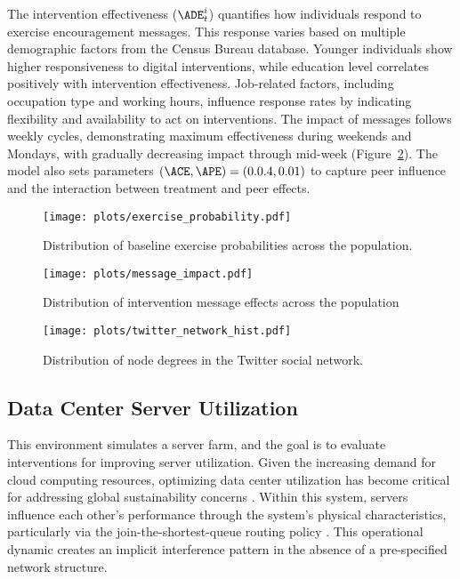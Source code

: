 The intervention effectiveness ($\ADE_t^i$) quantifies how individuals respond to exercise encouragement messages. This response varies based on multiple demographic factors from the Census Bureau database. Younger individuals show higher responsiveness to digital interventions, while education level correlates positively with intervention effectiveness. Job-related factors, including occupation type and working hours, influence response rates by indicating flexibility and availability to act on interventions. The impact of messages follows weekly cycles, demonstrating maximum effectiveness during weekends and Mondays, with gradually decreasing impact through mid-week (Figure~\ref{fig:message_impact}). The model also sets parameters $(\ACE, \APE) = (0.0.4,0.01)$ to capture peer influence and the interaction between treatment and peer effects.
% 
\begin{figure}
    \centering
    \texttt{[image: plots/exercise\_probability.pdf]}
    \caption{Distribution of baseline exercise probabilities across the population.}
    \label{fig:exercise_probability}
\end{figure}
% 
% 
\begin{figure}
    \centering
    \texttt{[image: plots/message\_impact.pdf]}
    \caption{Distribution of intervention message effects across the population}
    \label{fig:message_impact}
\end{figure}
% 

% 
\begin{figure}
    \centering
    \texttt{[image: plots/twitter\_network\_hist.pdf]}
    \caption{Distribution of node degrees in the Twitter social network.}
    \label{fig:twitter_network_hist}
\end{figure}
% 


\subsection{Data Center Server Utilization}
\label{sec:servers}
% 
This environment simulates a server farm, and the goal is to evaluate interventions for improving server utilization. Given the increasing demand for cloud computing resources, optimizing data center utilization has become critical for addressing global sustainability concerns \citep{zhang2023global,saxena2023sustainable}. Within this system, servers influence each other's performance through the system's physical characteristics, particularly via the join-the-shortest-queue routing policy \citep{gupta2007analysis}. This operational dynamic creates an implicit interference pattern in the absence of a pre-specified network structure.

